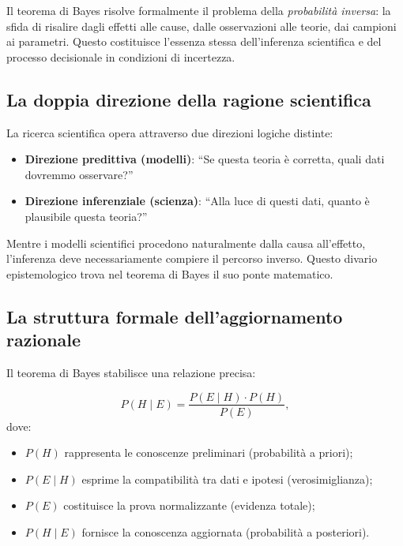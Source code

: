 \documentclass[
  letterpaper,
  DIV=11,
  numbers=noendperiod,
  oneside]{scrreprt}
\providecommand{\tightlist}{%
  \setlength{\itemsep}{0pt}\setlength{\parskip}{0pt}}
\theoremstyle{definition}
\theoremstyle{plain}
\theoremstyle{definition}
\theoremstyle{remark}
\begin{document}
Il teorema di Bayes risolve formalmente il problema della
\emph{probabilità inversa}: la sfida di risalire dagli effetti alle
cause, dalle osservazioni alle teorie, dai campioni ai parametri. Questo
costituisce l'essenza stessa dell'inferenza scientifica e del processo
decisionale in condizioni di incertezza.

\subsection{La doppia direzione della ragione
scientifica}\label{la-doppia-direzione-della-ragione-scientifica}

La ricerca scientifica opera attraverso due direzioni logiche distinte:

\begin{itemize}
\tightlist
\item
  \textbf{Direzione predittiva (modelli)}: ``Se questa teoria è
  corretta, quali dati dovremmo osservare?''
\item
  \textbf{Direzione inferenziale (scienza)}: ``Alla luce di questi dati,
  quanto è plausibile questa teoria?''
\end{itemize}

Mentre i modelli scientifici procedono naturalmente dalla causa
all'effetto, l'inferenza deve necessariamente compiere il percorso
inverso. Questo divario epistemologico trova nel teorema di Bayes il suo
ponte matematico.

\subsection{La struttura formale dell'aggiornamento
razionale}\label{la-struttura-formale-dellaggiornamento-razionale}

Il teorema di Bayes stabilisce una relazione precisa:

\[
P(H \mid E) = \frac{P(E \mid H) \cdot P(H)}{P(E)},
\] dove:

\begin{itemize}
\tightlist
\item
  \textbf{\(P(H)\)} rappresenta le conoscenze preliminari (probabilità a
  priori);
\item
  \textbf{\(P(E \mid H)\)} esprime la compatibilità tra dati e ipotesi
  (verosimiglianza);
\item
  \textbf{\(P(E)\)} costituisce la prova normalizzante (evidenza
  totale);
\item
  \textbf{\(P(H \mid E)\)} fornisce la conoscenza aggiornata
  (probabilità a posteriori).
\end{itemize}
\end{document}
